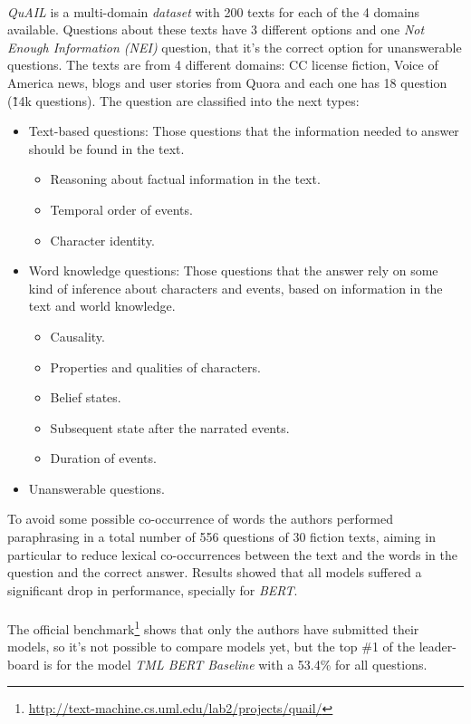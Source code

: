 \paragraph{}
\emph{QuAIL} is a multi-domain \emph{dataset} with 200 texts for each of the 4 domains available. Questions about these texts have 3 different options and one \emph{Not Enough Information (NEI)} question, that it's the correct option for unanswerable questions. The texts are from 4 different domains: CC license fiction, Voice of America news, blogs and user stories from Quora and each one has 18 question (\~14k questions). The question are classified into the next types:
\begin{itemize}
	\item Text-based questions: Those questions that the information needed to answer should be found in the text.
	\begin{itemize}
		\item Reasoning about factual information in the text.
		\item Temporal order of events.
		\item Character identity.
	\end{itemize}
	\item Word knowledge questions: Those questions that the answer rely on some kind of inference about characters and events, based on information in the text and world knowledge.
	\begin{itemize}
		\item Causality.
		\item Properties and qualities of characters.
		\item Belief states.
		\item Subsequent state after the narrated events.
		\item Duration of events.
	\end{itemize}
	\item Unanswerable questions. 
\end{itemize}
To avoid some possible co-occurrence of words the authors performed paraphrasing in a total number of 556 questions of 30 fiction texts, aiming in particular to reduce lexical co-occurrences between the text and the words in the question and the correct answer. Results showed that all models suffered a significant drop in performance, specially for \emph{BERT}.
\paragraph{}
The official benchmark\footnote{\url{http://text-machine.cs.uml.edu/lab2/projects/quail/}} shows that only the authors have submitted their models, so it's not possible to compare models yet, but the top \#1 of the leader-board is for the model \emph{TML BERT Baseline} with a 53.4\% for all questions.
